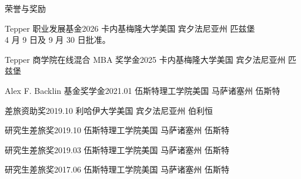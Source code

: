 \documentclass{resume}
\begin{document}
\begin{rSection}{荣誉与奖励}

\begin{nSubsection}
{Tepper 职业发展基金}{2026}
{卡内基梅隆大学}{美国 宾夕法尼亚州 匹兹堡}
\\ 4 月 9 日及 9 月 30 日批准。
\end{nSubsection}

\begin{nSubsection}
{Tepper 商学院在线混合 MBA 奖学金}{2025}
{卡内基梅隆大学}{美国 宾夕法尼亚州 匹兹堡}
\end{nSubsection}

\begin{nSubsection}
{Alex F. Backlin 基金奖学金}{2021.01}
{伍斯特理工学院}{美国 马萨诸塞州 伍斯特}
\end{nSubsection}

\begin{nSubsection}
{差旅资助奖}{2019.10}
{利哈伊大学}{美国 宾夕法尼亚州 伯利恒}
\end{nSubsection}

\begin{nSubsection}
{研究生差旅奖}{2019.10}
{伍斯特理工学院}{美国 马萨诸塞州 伍斯特}
\end{nSubsection}

\begin{nSubsection}
{研究生差旅奖}{2019.03}
{伍斯特理工学院}{美国 马萨诸塞州 伍斯特}
\end{nSubsection}

\begin{nSubsection}
{研究生差旅奖}{2017.06}
{伍斯特理工学院}{美国 马萨诸塞州 伍斯特}
\end{nSubsection}

\end{rSection}
\end{document}
